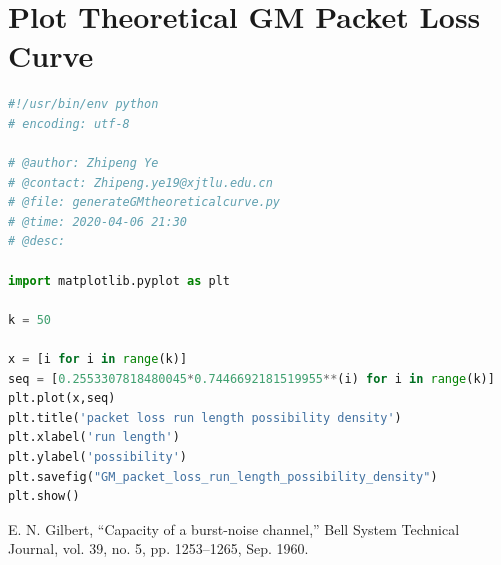 \documentclass[11pt]{article}
\begin{document}
\section{Plot Theoretical GM Packet Loss Curve}\label{TPLC}
\begin{lstlisting}[language=Python]
#!/usr/bin/env python
# encoding: utf-8

# @author: Zhipeng Ye
# @contact: Zhipeng.ye19@xjtlu.edu.cn
# @file: generateGMtheoreticalcurve.py
# @time: 2020-04-06 21:30
# @desc:

import matplotlib.pyplot as plt

k = 50

x = [i for i in range(k)]
seq = [0.2553307818480045*0.7446692181519955**(i) for i in range(k)]
plt.plot(x,seq)
plt.title('packet loss run length possibility density')
plt.xlabel('run length')
plt.ylabel('possibility')
plt.savefig("GM_packet_loss_run_length_possibility_density")
plt.show()

\end{lstlisting}
\newpage
\begin{thebibliography}{9}
E. N. Gilbert, “Capacity of a burst-noise channel,” Bell System Technical Journal, vol. 39, no. 5, pp. 1253–1265, Sep. 1960.
\end{thebibliography}
\end{document}
